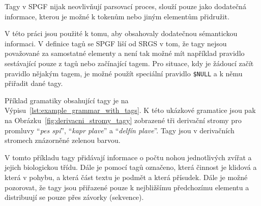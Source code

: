 Tagy v SPGF nijak neovlivňují parsovací proces, slouží pouze jako dodatečná informace,
kterou je možné k tokenům nebo jiným elementům přidružit.

V této práci jsou použité k tomu, aby obsahovaly dodatečnou sémantickou informaci.
V definice tagů se SPGF liší od SRGS v tom, že tagy nejsou považované za samostatné elementy a není tak možné mít například
pravidlo sestávající pouze z tagů nebo začínající tagem.
Pro situace, kdy je žádoucí začít pravidlo nějakým tagem,
je možné použít speciální pravidlo \texttt{\$NULL} a k němu přiřadit dané tagy.

Příklad gramatiky obsahující tagy je na Výpisu~\ref{lst:example_grammar_with_tags}.
K této ukázkové gramatice jsou pak na Obrázku~\ref{fig:derivacni_stromy_tagy} zobrazené tři derivační stromy pro promluvy
\enquote{\emph{pes spí}},
\enquote{\emph{kapr plave}}
a
\enquote{\emph{delfín plave}}.
Tagy jsou v derivačních stromech znázorněné zelenou barvou.

V tomto příkladu tagy přidávají informace o počtu nohou jednotlivých zvířat a jejich biologickou třídu.
Dále je pomocí tagů označeno, která činnost je klidová a která v pohybu, a která část textu je podmět a která přísudek.
Dále je možné pozorovat, že tagy jsou přiřazené pouze k nejbližšímu předchozímu elementu a distribuují se pouze přes závorky (sekvence).

